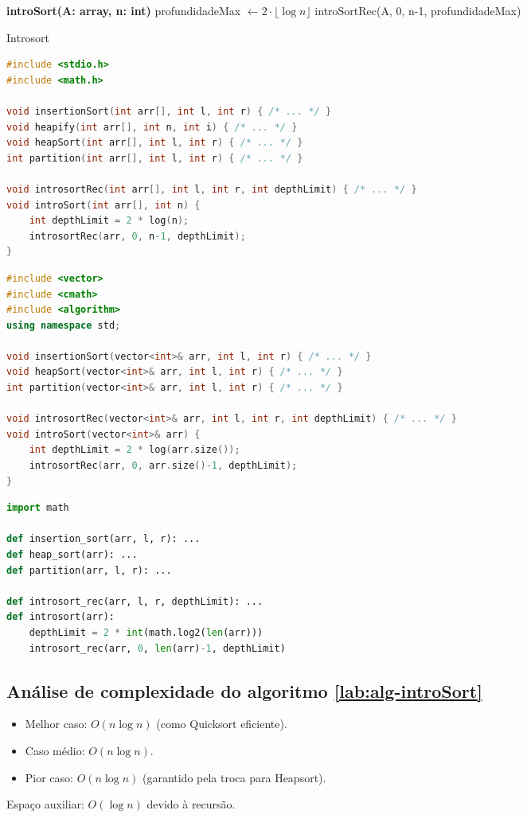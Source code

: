 \begin{algorithm}[H]
\DontPrintSemicolon
\textbf{introSort(A: array, n: int)}\;
profundidadeMax $\gets 2 \cdot \lfloor \log n \rfloor$\;
introSortRec(A, 0, n-1, profundidadeMax)\;
\caption{Introsort}
\label{lab:alg-introSort}
\end{algorithm}

\begin{lstlisting}[language=C, caption={Implementação do Introsort em C}, label=code:introSortC]
#include <stdio.h>
#include <math.h>

void insertionSort(int arr[], int l, int r) { /* ... */ }
void heapify(int arr[], int n, int i) { /* ... */ }
void heapSort(int arr[], int l, int r) { /* ... */ }
int partition(int arr[], int l, int r) { /* ... */ }

void introsortRec(int arr[], int l, int r, int depthLimit) { /* ... */ }
void introSort(int arr[], int n) {
    int depthLimit = 2 * log(n);
    introsortRec(arr, 0, n-1, depthLimit);
}
\end{lstlisting}

\begin{lstlisting}[language=C++, caption={Implementação do Introsort em C++}, label=code:introSortCpp]
#include <vector>
#include <cmath>
#include <algorithm>
using namespace std;

void insertionSort(vector<int>& arr, int l, int r) { /* ... */ }
void heapSort(vector<int>& arr, int l, int r) { /* ... */ }
int partition(vector<int>& arr, int l, int r) { /* ... */ }

void introsortRec(vector<int>& arr, int l, int r, int depthLimit) { /* ... */ }
void introSort(vector<int>& arr) {
    int depthLimit = 2 * log(arr.size());
    introsortRec(arr, 0, arr.size()-1, depthLimit);
}
\end{lstlisting}

\begin{lstlisting}[language=Python, caption={Implementação do Introsort em Python}, label=code:introSortPy]
import math

def insertion_sort(arr, l, r): ...
def heap_sort(arr): ...
def partition(arr, l, r): ...

def introsort_rec(arr, l, r, depthLimit): ...
def introsort(arr):
    depthLimit = 2 * int(math.log2(len(arr)))
    introsort_rec(arr, 0, len(arr)-1, depthLimit)
\end{lstlisting}

\subsection{Análise de complexidade do algoritmo \ref{lab:alg-introSort}}
\begin{itemize}
    \item Melhor caso: $O(n \log n)$ (como Quicksort eficiente).
    \item Caso médio: $O(n \log n)$.
    \item Pior caso: $O(n \log n)$ (garantido pela troca para Heapsort).
\end{itemize}
Espaço auxiliar: $O(\log n)$ devido à recursão.

